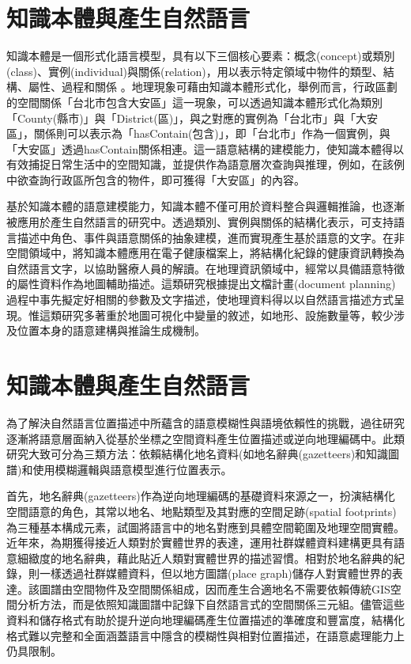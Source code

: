 
\section{知識本體與產生自然語言}

知識本體是一個形式化語言模型，具有以下三個核心要素：概念(concept)或類別(class)、實例(individual)與關係(relation)，用以表示特定領域中物件的類型、結構、屬性、過程和關係\citep{RN24} 。地理現象可藉由知識本體形式化，舉例而言，行政區劃的空間關係「台北市包含大安區」這一現象，可以透過知識本體形式化為類別「County(縣市)」與「District(區)」，與之對應的實例為「台北市」與「大安區」，關係則可以表示為「hasContain(包含)」，即「台北市」作為一個實例，與「大安區」透過hasContain關係相連。這一語意結構的建模能力，使知識本體得以有效捕捉日常生活中的空間知識，並提供作為語意層次查詢與推理，例如，在該例中欲查詢行政區所包含的物件，即可獲得「大安區」的內容。

基於知識本體的語意建模能力，知識本體不僅可用於資料整合與邏輯推論，也逐漸被應用於產生自然語言的研究中。透過類別、實例與關係的結構化表示，可支持語言描述中角色、事件與語意關係的抽象建模，進而實現產生基於語意的文字。在非空間領域中，\citet{RN163}將知識本體應用在電子健康檔案上，將結構化紀錄的健康資訊轉換為自然語言文字，以協助醫療人員的解讀。在地理資訊領域中，經常以具備語意特徵的屬性資料作為地圖輔助描述\citep{RN165, RN166}。這類研究根據提出文檔計畫(document planning)過程中事先擬定好相關的參數及文字描述，使地理資料得以以自然語言描述方式呈現。惟這類研究多著重於地圖可視化中變量的敘述，如地形、設施數量等，較少涉及位置本身的語意建構與推論生成機制。

\section{知識本體與產生自然語言}

為了解決自然語言位置描述中所蘊含的語意模糊性與語境依賴性的挑戰，過往研究逐漸將語意層面納入從基於坐標之空間資料產生位置描述或逆向地理編碼中。此類研究大致可分為三類方法：依賴結構化地名資料(如地名辭典(gazetteers)和知識圖譜)和使用模糊邏輯與語意模型進行位置表示。

首先，地名辭典(gazetteers)作為逆向地理編碼的基礎資料來源之一，扮演結構化空間語意的角色，其常以地名、地點類型及其對應的空間足跡(spatial footprints)為三種基本構成元素\citep{RN122, RN159, RN31}，試圖將語言中的地名對應到具體空間範圍及地理空間實體。近年來，為期獲得接近人類對於實體世界的表達，運用社群媒體資料建構更具有語意細緻度的地名辭典，藉此貼近人類對實體世界的描述習慣\citep{RN31}。相對於地名辭典的紀錄，\citet{RN23}則一樣透過社群媒體資料，但以地方圖譜(place graph)儲存人對實體世界的表達。該圖譜由空間物件及空間關係組成，因而產生合適地名不需要依賴傳統GIS空間分析方法，而是依照知識圖譜中記錄下自然語言式的空間關係三元組。儘管這些資料和儲存格式有助於提升逆向地理編碼產生位置描述的準確度和豐富度，結構化格式難以完整和全面涵蓋語言中隱含的模糊性與相對位置描述，在語意處理能力上仍具限制。

